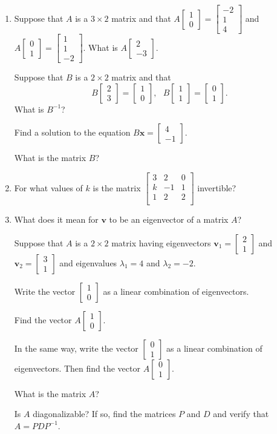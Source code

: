 \documentclass[12pt]{article}
\newcommand{\vs}[1]{\vspace{#1in}}
\newcommand{\vvec}{{\mathbf v}}
\newcommand{\xvec}{{\mathbf x}}
\newcommand{\real}{{\mathbb R}}
\newcommand{\twovec}[2]{\left[\begin{array}{r}#1 \\ #2
    \end{array}\right]}
\newcommand{\threevec}[3]{\left[\begin{array}{r}#1 \\ #2 \\ #3
  \end{array}\right]}
\newcommand{\rank}{\text{rank}}
\newcommand{\col}{\text{Col}}
\newcommand{\nul}{\text{Nul}}
\begin{document}
\begin{enumerate}
  \vs{1}
  If $B$ is a $12\times10$ matrix, what is the largest possible
  value of $\rank(B)$?

  \vs{1}
  \newpage
  If $\rank(B)$ is this largest possible value, what can you say about
  $\col(B)$ and what can you say about $\nul(B)$?

  \vs{1}
\item Suppose that $A$ is a $3\times2$ matrix and that
  $A\twovec10 = \threevec{-2}{1}4$ and $A\twovec01 = \threevec11{-2}$.
  What is $A\twovec2{-3}$.

  \vs{1}
  Suppose that $B$ is a $2\times2$ matrix and that
  $$
  B\twovec23 = \twovec10,~~~B\twovec11 = \twovec01.
  $$
  What is $B^{-1}$?

  \vs{1}
  Find a solution to the equation $B\xvec=\twovec4{-1}$.

  \vs{1}
  What is the matrix $B$?

  \vs{1}
  \newpage
\item For what values of $k$ is the matrix
  $\begin{bmatrix}
    3 & 2 & 0 \\
    k & -1 & 1 \\
    1 & 2 & 2 \\
  \end{bmatrix}$ invertible?
  
  \vs{1.5}
\item What does it mean for $\vvec$ to be an eigenvector of a matrix
  $A$?

  \vs{1}

  Suppose that $A$ is a $2\times2$ matrix having eigenvectors
  $\vvec_1 = \twovec21$ and $\vvec_2=\twovec31$ and eigenvalues
  $\lambda_1=4$ and $\lambda_2=-2$.

  Write the vector $\twovec10$ as a linear combination of
  eigenvectors.

  \vs{1}
  Find the vector $A\twovec10$.

  \vs{1}
  In the same way, write the vector $\twovec01$ as a linear
  combination of eigenvectors.  Then find the vector $A\twovec01$.

  \vs{1.5}
  What is the matrix $A$?

  \vs{1}
  Is $A$ diagonalizable?  If so, find the matrices $P$ and $D$ and
  verify that $A=PDP^{-1}$.
    
  
  

\end{enumerate}
\end{document}
